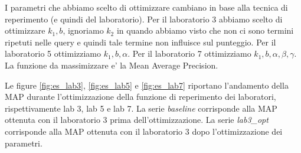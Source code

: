 I parametri che abbiamo scelto di ottimizzare cambiano in base alla tecnica di reperimento (e quindi del laboratorio). Per il laboratorio 3 abbiamo scelto di ottimizzare $k_1, b$, ignoriamo $k_2$ in quando abbiamo visto che non ci sono termini ripetuti nelle query e quindi tale termine non influisce sul punteggio. Per il laboratorio 5 ottimizziamo $k_1, b, \alpha$. Per il laboratorio 7 ottimizziamo $k_1, b, \alpha, \beta, \gamma$. La funzione da massimizzare e' la Mean Average Precision.

Le figure \ref{fig:es_lab3}, \ref{fig:es_lab5} e \ref{fig:es_lab7} riportano l'andamento della MAP durante l'ottimizzazione della funzione di reperimento dei laboratori, rispettivamente lab 3, lab 5 e lab 7. La serie \textit{baseline} corrisponde alla MAP ottenuta con il laboratorio 3 prima dell'ottimizzazione. La serie \textit{lab3\_opt} corrisponde alla MAP ottenuta con il laboratorio 3 dopo l'ottimizzazione dei parametri.

